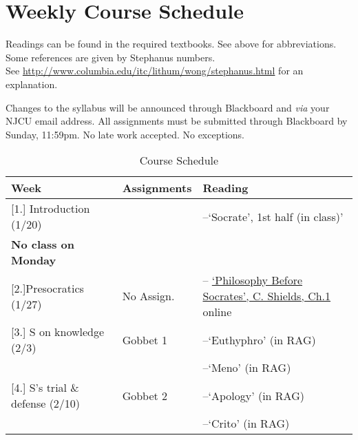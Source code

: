 \documentclass[article,oneside]{memoir}
\begin{document}
\section{Weekly Course Schedule}
Readings can be found in the required textbooks. See above for abbreviations. Some references are given by Stephanus numbers.\\ See \href{http://www.columbia.edu/itc/lithum/wong/stephanus.html}{http://www.columbia.edu/itc/lithum/wong/stephanus.html} for an explanation. 

 Changes to the syllabus will be announced through Blackboard and \emph{via} your NJCU email address.  All assignments must be submitted through Blackboard by Sunday, 11:59pm. No late work accepted. No exceptions.   \newline

\begin{center}
\begin{longtable}{p{4.5cm}p{2cm}p{4.5cm}}
 
  \caption{Course Schedule} \\
  \toprule
  \textbf{Week} &\textbf{Assignments} & \textbf{Reading} \\
  \midrule

  

[1.] Introduction (1/20)	&  		& --`Socrate', 1st half (in class)' \\ 
\textbf{No class on Monday}		&		  &    \\ [1.8\baselineskip] \hline

[2.]Presocratics (1/27)	  	& No Assign.			& -- \href{https://scottoconnor.org/ancient/Shields2.pdf}{`Philosophy Before Socrates', C. Shields, Ch.1} online  \\ [1.8\baselineskip] \hline

[3.] S on knowledge (2/3)			& Gobbet 1		& --`Euthyphro'  (in RAG) \\
			        				&			  	&  --`Meno' (in RAG) \\ [1.8\baselineskip]  \hline %

[4.] S's trial \& defense (2/10)		& Gobbet 2		& --`Apology' (in RAG) \\
			     				& 			         & --`Crito' (in RAG)  \\ [1.8\baselineskip]  \hline


\end{longtable}
\end{center}
\end{document}
